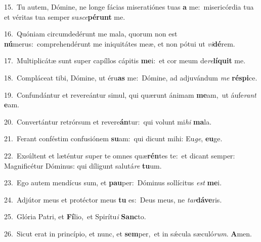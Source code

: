 {\numbfont\textcolor{\numbcolor}{15.}}~Tu autem, Dómine, ne longe fácias miseratiónes tuas \textbf{a} me:~\star misericórdia tua et véritas tua semper su\-\textit{sce}\-\textbf{pé}\textbf{runt} me.\par
{\numbfont\textcolor{\numbcolor}{16.}}~Quóniam circumdedérunt me mala, quorum non est \textbf{nú}\-merus:~\star comprehendérunt me iniquitátes meæ, et non pótui ut \textit{vi}\-\textbf{dé}rem.\par
{\numbfont\textcolor{\numbcolor}{17.}}~Multiplicátæ sunt super capíllos cápitis \textbf{me}\-i:~\star et cor meum de\-\textit{re}\-\textbf{lí}\textbf{quit} me.\par
{\numbfont\textcolor{\numbcolor}{18.}}~Compláceat tibi, Dómine, ut éru\textbf{as} me:~\star Dómine, ad adjuvándum \textit{me} \textbf{ré}\-\textbf{spi}ce.\par
{\numbfont\textcolor{\numbcolor}{19.}}~Confundántur et revereántur simul, qui quærunt ánimam \textbf{me}\-am,~\star ut áufe\textit{rant} \textbf{e}\-am.\par
{\numbfont\textcolor{\numbcolor}{20.}}~Convertántur retrórsum et revere\-\textbf{án}\-tur:~\star qui volunt mi\textit{hi} \textbf{ma}\-la.\par
{\numbfont\textcolor{\numbcolor}{21.}}~Ferant conféstim confusiónem \textbf{su}\-am:~\star qui dicunt mihi: Eu\-\textit{ge}\-, \textbf{eu}\-ge.\par
{\numbfont\textcolor{\numbcolor}{22.}}~Exsúltent et læténtur super te omnes quæ\-\textbf{rén}\-tes te:~\star et dicant semper: Magnificétur Dóminus: qui díligunt salutá\textit{re} \textbf{tu}\-um.\par
{\numbfont\textcolor{\numbcolor}{23.}}~Ego autem mendícus sum, et \textbf{pau}\-per:~\star Dóminus sollícitus \textit{est} \textbf{me}\-i.\par
{\numbfont\textcolor{\numbcolor}{24.}}~Adjútor meus et protéctor meus \textbf{tu} es:~\star Deus meus, ne \textit{tar}\-\textbf{dá}\textbf{ve}ris.\par
{\numbfont\textcolor{\numbcolor}{25.}}~Glória Patri, et \textbf{Fí}\-lio,~\star et Spirítu\textit{i} \textbf{Sanc}\-to.\par
{\numbfont\textcolor{\numbcolor}{26.}}~Sicut erat in princípio, et nunc, et \textbf{sem}\-per,~\star et in sǽcula sæculó\-\textit{rum}\-. \textbf{A}\-men.\par

